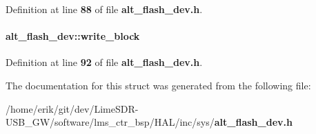 Definition at line {\bf 88} of file {\bf alt\+\_\+flash\+\_\+dev.\+h}.

\paragraph[{write\+\_\+block}]{ alt\+\_\+flash\+\_\+dev\+::write\+\_\+block}\label{structalt__flash__dev_afd8a37263308767fcdc6b9161c1ca87e}


Definition at line {\bf 92} of file {\bf alt\+\_\+flash\+\_\+dev.\+h}.



The documentation for this struct was generated from the following file\+:\begin{DoxyCompactItemize}
\item 
/home/erik/git/dev/\+Lime\+S\+D\+R-\/\+U\+S\+B\+\_\+\+G\+W/software/lms\+\_\+ctr\+\_\+bsp/\+H\+A\+L/inc/sys/{\bf alt\+\_\+flash\+\_\+dev.\+h}\end{DoxyCompactItemize}
